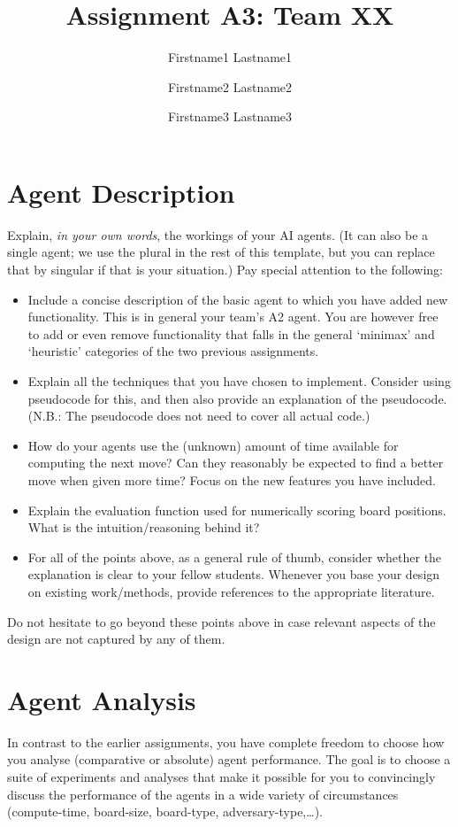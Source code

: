 \documentclass[11pt]{article}
\title{Assignment A3: Team XX}
\author{Firstname1 Lastname1 \and Firstname2 Lastname2 \and Firstname3 Lastname3}
\date{}
\begin{document}
\maketitle


\section{Agent Description}\label{sec:description}
Explain, \emph{in your own words}, the workings of your AI agents.
(It can also be a single agent; we use the plural in the rest of this template, but you can replace that by singular if that is your situation.)
Pay special attention to the following:
\begin{itemize}
	\item Include a concise description of the basic agent to which you have added new functionality.
	This is in general your team's A2 agent.
	You are however free to add or even remove functionality that falls in the general ‘minimax’ and ‘heuristic’ categories of the two previous assignments.
	\item Explain all the techniques that you have chosen to implement.
	Consider using pseudocode for this, and then also provide an explanation of the pseudocode.
	(N.B.: The pseudocode does not need to cover all actual code.)
	\item How do your agents use the (unknown) amount of time available for computing the next move? Can they reasonably be expected to find a better move when given more time? Focus on the new features you have included.
	\item Explain the evaluation function used for numerically scoring board positions.
	What is the intuition/reasoning behind it?
	\item For all of the points above, as a general rule of thumb, consider whether the explanation is clear to your fellow students. Whenever you base your design on existing work/methods, provide references to the appropriate literature.
\end{itemize}
Do not hesitate to go beyond these points above in case relevant aspects of the design are not captured by any of them.

\section{Agent Analysis}\label{sec:analysis}
In contrast to the earlier assignments, you have complete freedom to choose how you analyse (comparative or absolute) agent performance.
The goal is to choose a suite of experiments and analyses that make it possible for you to convincingly discuss the performance of the agents in a wide variety of circumstances (compute-time, board-size, board-type, adversary-type,…).
\end{document}
